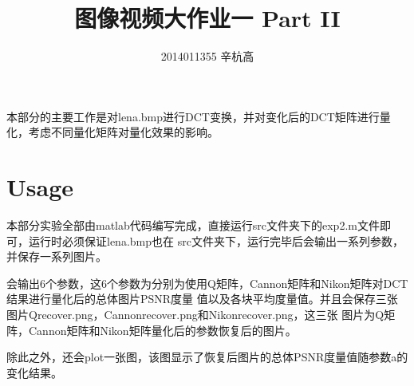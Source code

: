 \documentclass{ctexart}
\author{2014011355 辛杭高}
\title{图像视频大作业一 Part II}
\begin{document}
\maketitle
本部分的主要工作是对lena.bmp进行DCT变换，并对变化后的DCT矩阵进行量化，考虑不同量化矩阵对量化效果的影响。


\section{Usage}
本部分实验全部由matlab代码编写完成，直接运行src文件夹下的exp2.m文件即可，运行时必须保证lena.bmp也在
src文件夹下，运行完毕后会输出一系列参数，并保存一系列图片。

会输出6个参数，这6个参数为分别为使用Q矩阵，Cannon矩阵和Nikon矩阵对DCT结果进行量化后的总体图片PSNR度量
值以及各块平均度量值。并且会保存三张图片Qrecover.png，Cannonrecover.png和Nikonrecover.png，这三张
图片为Q矩阵，Cannon矩阵和Nikon矩阵量化后的参数恢复后的图片。

除此之外，还会plot一张图，该图显示了恢复后图片的总体PSNR度量值随参数a的变化结果。
\end{document}
